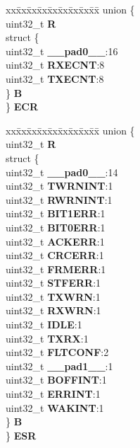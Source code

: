 \begin{DoxyCompactItemize}
\begin{tabbing}
\end{tabbing}\item 
\mbox{\label{structFLEXCAN2__tag_ae2860f386925dc5443d6146333785053}} 
\begin{tabbing}
xx\=xx\=xx\=xx\=xx\=xx\=xx\=xx\=xx\=\kill
union \{\\
\>uint32\_t {\bfseries R}\\
\>struct \{\\
\>\>uint32\_t {\bfseries \_\_pad0\_\_}:16\\
\>\>uint32\_t {\bfseries RXECNT}:8\\
\>\>uint32\_t {\bfseries TXECNT}:8\\
\>\} {\bfseries B}\\
\} {\bfseries ECR}\\

\end{tabbing}\item 
\mbox{\label{structFLEXCAN2__tag_a15ad20c754f5a08f6e39476fd5fbef2a}} 
\begin{tabbing}
xx\=xx\=xx\=xx\=xx\=xx\=xx\=xx\=xx\=\kill
union \{\\
\>uint32\_t {\bfseries R}\\
\>struct \{\\
\>\>uint32\_t {\bfseries \_\_pad0\_\_}:14\\
\>\>uint32\_t {\bfseries TWRNINT}:1\\
\>\>uint32\_t {\bfseries RWRNINT}:1\\
\>\>uint32\_t {\bfseries BIT1ERR}:1\\
\>\>uint32\_t {\bfseries BIT0ERR}:1\\
\>\>uint32\_t {\bfseries ACKERR}:1\\
\>\>uint32\_t {\bfseries CRCERR}:1\\
\>\>uint32\_t {\bfseries FRMERR}:1\\
\>\>uint32\_t {\bfseries STFERR}:1\\
\>\>uint32\_t {\bfseries TXWRN}:1\\
\>\>uint32\_t {\bfseries RXWRN}:1\\
\>\>uint32\_t {\bfseries IDLE}:1\\
\>\>uint32\_t {\bfseries TXRX}:1\\
\>\>uint32\_t {\bfseries FLTCONF}:2\\
\>\>uint32\_t {\bfseries \_\_pad1\_\_}:1\\
\>\>uint32\_t {\bfseries BOFFINT}:1\\
\>\>uint32\_t {\bfseries ERRINT}:1\\
\>\>uint32\_t {\bfseries WAKINT}:1\\
\>\} {\bfseries B}\\
\} {\bfseries ESR}\\


\end{tabbing}
\end{DoxyCompactItemize}

